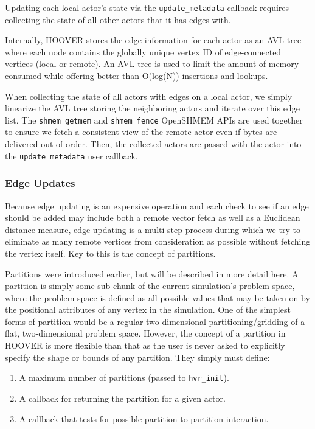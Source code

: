 Updating each local actor's state via the \texttt{update\_metadata} callback
requires collecting the state of all other actors that it has edges with.

Internally, HOOVER stores the edge information for each actor as an AVL tree
where each node contains the globally unique vertex ID of edge-connected
vertices (local or remote). An AVL tree is used to limit the amount of memory
consumed while offering better than O(log(N)) insertions and lookups.

When collecting the state of all actors with edges on a local actor, we simply
linearize the AVL tree storing the neighboring actors and iterate over this edge
list. The \texttt{shmem\_getmem} and \texttt{shmem\_fence} OpenSHMEM APIs are
used together to ensure we fetch a consistent view of the remote actor even if
bytes are delivered out-of-order. Then, the collected actors are passed with the
actor into the \texttt{update\_metadata} user callback.

\subsubsection{Edge Updates}
\label{sec:edge_updates}

Because edge updating is an expensive operation and each check to see if an edge
should be added may include both a remote vector fetch as well as a Euclidean
distance measure, edge updating is a multi-step process during which we try to
eliminate as many remote vertices from consideration as possible without
fetching the vertex itself. Key to this is the concept of partitions.

Partitions were introduced earlier, but will be described in more detail here. A
partition is simply some sub-chunk of the current simulation's problem space,
where the problem space is defined as all possible values that may be taken on
by the positional attributes of any vertex in the simulation. One of the simplest
forms of partition would be a regular two-dimensional partitioning/gridding of a
flat, two-dimensional problem space. However, the concept of a partition in HOOVER
is more flexible than that as the user is never asked to explicitly specify the
shape or bounds of any partition. They simply must define:

\begin{enumerate}
    \item A maximum number of partitions (passed to \texttt{hvr\_init}).
    \item A callback for returning the partition for a given actor.
    \item A callback that tests for possible partition-to-partition interaction.
\end{enumerate}

